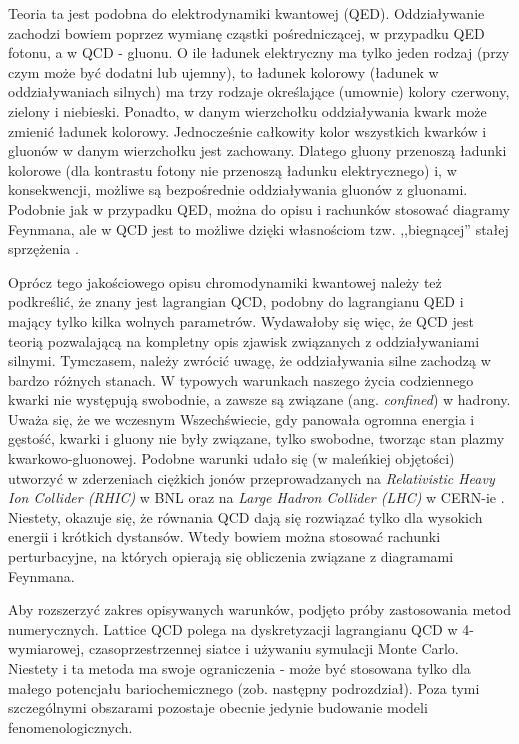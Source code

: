 \documentclass[a4paper,12pt]{article}
\begin{document}
Teoria ta jest podobna do elektrodynamiki kwantowej (QED). Oddziaływanie zachodzi bowiem poprzez wymianę cząstki pośredniczącej, w przypadku QED fotonu, a w QCD - gluonu. O ile ładunek elektryczny ma tylko jeden rodzaj (przy czym może być dodatni lub ujemny), to ładunek kolorowy (ładunek w oddziaływaniach silnych) ma trzy rodzaje określające (umownie) kolory czerwony, zielony i niebieski. Ponadto, w danym wierzchołku oddziaływania kwark może zmienić ładunek kolorowy. Jednocześnie całkowity kolor wszystkich kwarków i gluonów \quad \quad \quad w danym wierzchołku jest zachowany. Dlatego gluony przenoszą ładunki kolorowe (dla kontrastu fotony nie przenoszą ładunku elektrycznego) i, w konsekwencji, możliwe są bezpośrednie oddziaływania gluonów z gluonami. Podobnie jak w przypadku QED, można do opisu i rachunków stosować diagramy Feynmana, ale w QCD jest to możliwe dzięki własnościom tzw. ,,biegnącej'' stałej sprzężenia \cite{griffiths}.

Oprócz tego jakościowego opisu chromodynamiki kwantowej należy też podkreślić, że znany jest lagrangian QCD, podobny do lagrangianu QED i mający tylko kilka wolnych parametrów. Wydawałoby się więc, że QCD jest teorią pozwalającą na kompletny opis zjawisk związanych z oddziaływaniami silnymi. Tymczasem, należy zwrócić uwagę, że oddziaływania silne zachodzą w bardzo różnych stanach. W typowych warunkach naszego życia codziennego kwarki nie występują swobodnie, a zawsze są związane (ang. \textit{confined}) w hadrony. Uważa się, że we wczesnym Wszechświecie, gdy panowała ogromna energia i gęstość, kwarki i gluony nie były związane, tylko swobodne, tworząc stan plazmy kwarkowo-gluonowej. Podobne warunki udało się (w maleńkiej objętości) utworzyć w zderzeniach ciężkich jonów przeprowadzanych na \textit{Relativistic Heavy Ion Collider (RHIC)} w BNL oraz na \textit{Large Hadron Collider (LHC)} w CERN-ie \cite{florkowski}. Niestety, okazuje się, że równania QCD dają się rozwiązać tylko dla wysokich energii i krótkich dystansów. Wtedy bowiem można stosować rachunki perturbacyjne, na których opierają się obliczenia związane z diagramami Feynmana.

Aby rozszerzyć zakres opisywanych warunków, podjęto próby zastosowania metod numerycznych. Lattice QCD polega na dyskretyzacji lagrangianu QCD w 4-wymiarowej, czasoprzestrzennej siatce i używaniu symulacji Monte Carlo. Niestety i ta metoda ma swoje ograniczenia - może być stosowana tylko dla małego potencjału bariochemicznego (zob. następny podrozdział). Poza tymi szczególnymi obszarami pozostaje obecnie jedynie budowanie modeli fenomenologicznych.
\end{document}
